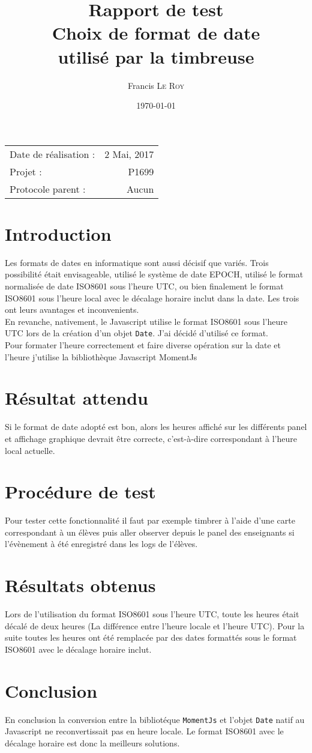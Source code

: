 \documentclass[10pt,a4paper,onecolumn]{article}
\title{Rapport de test \\ Choix de format de date \\ utilisé par la timbreuse}
\author{Francis \textsc{Le Roy}}
\date{\today}
\begin{document}
\maketitle
\thispagestyle{fancy}

\begin{center}
\begin{tabular}{l r}
Date de réalisation : & 2 Mai, 2017 \\
Projet : & P1699 \\
Protocole parent : & Aucun
\end{tabular}
\end{center}

\section{Introduction}
Les formats de dates en informatique sont aussi décisif que variés. Trois possibilité était envisageable, utilisé le système de date EPOCH, utilisé le format normalisée de date ISO8601 \cite{isodate} sous l'heure UTC, ou bien finalement le format ISO8601 sous l'heure local avec le décalage horaire inclut dans la date. Les trois ont leurs avantages et inconvenients. \\
En revanche, nativement, le Javascript utilise le format ISO8601 sous l'heure UTC lors de la création d'un objet \texttt{Date}. J'ai décidé d'utilisé ce format. \\
Pour formater l'heure correctement et faire diverse opération sur la date et l'heure j'utilise la bibliothèque Javascript MomentJs \cite{momentjs}
\section{Résultat attendu}
Si le format de date adopté est bon, alors les heures affiché sur les différents panel et affichage graphique devrait être correcte, c'est-à-dire correspondant à l'heure local actuelle.
\section{Procédure de test}
Pour tester cette fonctionnalité il faut par exemple timbrer à l'aide d'une carte correspondant à un élèves puis aller observer depuis le panel des enseignants si l'évènement à été enregistré dans les logs de l'élèves.
\section{Résultats obtenus}
Lors de l'utilisation du format ISO8601 sous l'heure UTC, toute les heures était décalé de deux heures (La différence entre l'heure locale et l'heure UTC). Pour la suite toutes les heures ont été remplacée par des dates formattés sous le format ISO8601 avec le décalage horaire inclut.
\section{Conclusion}
En conclusion la conversion entre la bibliotéque \texttt{MomentJs} et l'objet \texttt{Date} natif au Javascript ne reconvertissait pas en heure locale. Le format ISO8601 avec le décalage horaire est donc la meilleurs solutions.
\printbibliography
\end{document}
